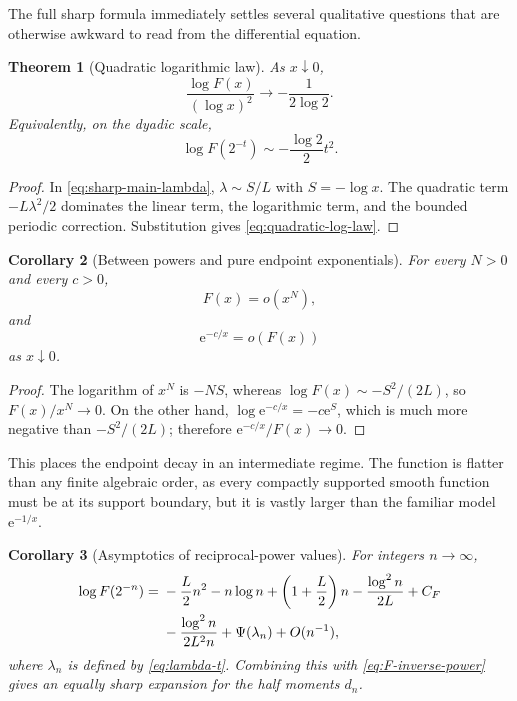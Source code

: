 \documentclass[11pt,oneside]{article}
\newtheorem{theorem}{Theorem}[section]
\newtheorem{corollary}[theorem]{Corollary}
\theoremstyle{definition}
\theoremstyle{remark}
\newcommand{\e}{\mathrm e}
\begin{document}
The full sharp formula immediately settles several qualitative questions that are otherwise
awkward to read from the differential equation.

\begin{theorem}[Quadratic logarithmic law]
As $x\downarrow0$,
\begin{equation}
 \frac{\log F(x)}{(\log x)^2}\longrightarrow-\frac1{2\log2}. \label{eq:quadratic-log-law}
\end{equation}
Equivalently, on the dyadic scale,
\begin{equation}
 \log F(2^{-t})\sim-\frac{\log2}{2}t^2.                    \label{eq:dyadic-quadratic-law}
\end{equation}
\end{theorem}

\begin{proof}
In \eqref{eq:sharp-main-lambda}, $\lambda\sim S/L$ with $S=-\log x$.  The quadratic term
$-L\lambda^2/2$ dominates the linear term, the logarithmic term, and the bounded periodic
correction.  Substitution gives \eqref{eq:quadratic-log-law}.
\end{proof}

\begin{corollary}[Between powers and pure endpoint exponentials]
\label{cor:decay-comparison}
For every $N>0$ and every $c>0$,
\begin{equation}
 F(x)=o(x^N),                                               \label{eq:faster-than-powers}
\end{equation}
and
\begin{equation}
 \e^{-c/x}=o(F(x))                                         \label{eq:slower-than-exp-inv-x}
\end{equation}
as $x\downarrow0$.
\end{corollary}

\begin{proof}
The logarithm of $x^N$ is $-NS$, whereas
$\log F(x)\sim-S^2/(2L)$, so $F(x)/x^N\to0$.  On the other hand,
$\log\e^{-c/x}=-c\e^S$, which is much more negative than $-S^2/(2L)$; therefore
$\e^{-c/x}/F(x)\to0$.
\end{proof}

This places the endpoint decay in an intermediate regime.  The function is flatter than any
finite algebraic order, as every compactly supported smooth function must be at its support
boundary, but it is vastly larger than the familiar model $\e^{-1/x}$.

\begin{corollary}[Asymptotics of reciprocal-power values]
For integers $n\to\infty$,
\begin{align}
 \log F(2^{-n})
={}&-\frac L2n^2-n\log n+
 \left(1+\frac L2\right)n-\frac{\log^2n}{2L}+C_F           \notag\\
 &-\frac{\log^2n}{2L^2n}+\Psi(\lambda_n)+O(n^{-1}),       \label{eq:integer-dyadic-asymptotic}
\end{align}
where $\lambda_n$ is defined by \eqref{eq:lambda-t}.  Combining this with
\eqref{eq:F-inverse-power} gives an equally sharp expansion for the half moments $d_n$.
\end{corollary}
\end{document}
